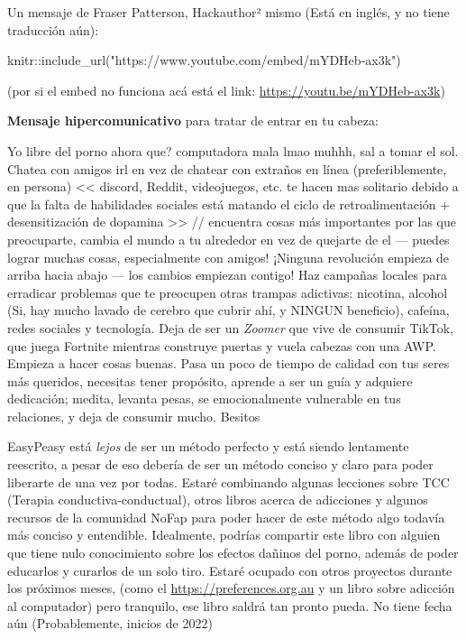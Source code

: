 \documentclass[
  openany]{book}
\newenvironment{Shaded}{\begin{snugshade}}{\end{snugshade}}
\newcommand{\FunctionTok}[1]{\textcolor[rgb]{0.00,0.00,0.00}{#1}}
\newcommand{\NormalTok}[1]{#1}
\newcommand{\SpecialCharTok}[1]{\textcolor[rgb]{0.00,0.00,0.00}{#1}}
\newcommand{\StringTok}[1]{\textcolor[rgb]{0.31,0.60,0.02}{#1}}
\let\oldurl\url
\renewcommand\url{\renewcommand\UrlFont{\ttfamily\color{blue}}\oldurl}
\begin{document}
Un mensaje de Fraser Patterson, Hackauthor² mismo (Está en inglés, y no tiene traducción aún):

\begin{Shaded}
\begin{Highlighting}[]
\NormalTok{knitr}\SpecialCharTok{::}\FunctionTok{include\_url}\NormalTok{(}\StringTok{"https://www.youtube.com/embed/mYDHeb{-}ax3k"}\NormalTok{)}
\end{Highlighting}
\end{Shaded}

(por si el embed no funciona acá está el link: \url{https://youtu.be/mYDHeb-ax3k})

\textbf{Mensaje hipercomunicativo} para tratar de entrar en tu cabeza:

Yo libre del porno ahora que? \textbar\textbar\textbar{} computadora mala lmao muhhh, sal a tomar el sol. Chatea con amigos irl en vez de chatear con extraños en línea (preferiblemente, en persona) \textless\textless{} discord, Reddit, videojuegos, etc. te hacen mas solitario debido a que la falta de habilidades sociales está matando el ciclo de retroalimentación + desensitización de dopamina \textgreater\textgreater{} // encuentra cosas más importantes por las que preocuparte, cambia el mundo a tu alrededor en vez de quejarte de el --- puedes lograr muchas cosas, especialmente con amigos! ¡Ninguna revolución empieza de arriba hacia abajo --- los cambios empiezan contigo! Haz campañas locales para erradicar problemas que te preocupen \textbar\textbar{} otras trampas adictivas: nicotina, alcohol (Si, hay mucho lavado de cerebro que cubrir ahí, y NINGUN beneficio), cafeína, redes sociales y tecnología. Deja de ser un \emph{Zoomer} que vive de consumir TikTok, que juega Fortnite mientras construye puertas y vuela cabezas con una AWP. Empieza a hacer cosas buenas. Pasa un poco de tiempo de calidad con tus seres más queridos, necesitas tener propósito, aprende a ser un guía y adquiere dedicación; medita, levanta pesas, se emocionalmente vulnerable en tus relaciones, y deja de consumir mucho. Besitos

EasyPeasy está \emph{lejos} de ser un método perfecto y está siendo lentamente reescrito, a pesar de eso debería de ser un método conciso y claro para poder liberarte de una vez por todas. Estaré combinando algunas lecciones sobre TCC (Terapia conductiva-conductual), otros libros acerca de adicciones y algunos recursos de la comunidad NoFap para poder hacer de este método algo todavía más conciso y entendible. Idealmente, podrías compartir este libro con alguien que tiene nulo conocimiento sobre los efectos dañinos del porno, además de poder educarlos y curarlos de un solo tiro. Estaré ocupado con otros proyectos durante los próximos meses, (como el \url{https://preferences.org.au} y un libro sobre adicción al computador) pero tranquilo, ese libro saldrá tan pronto pueda. No tiene fecha aún (Probablemente, inicios de 2022)
\end{document}
